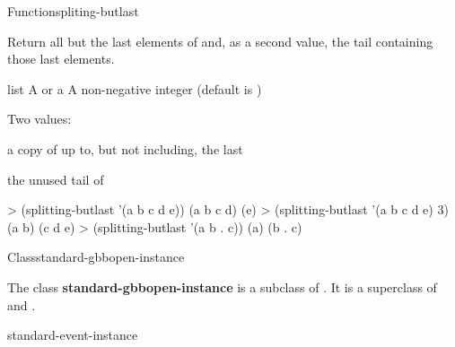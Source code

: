 \documentclass[10pt,twoside,english,pdftex]{article}
\begin{document}
\begin{functiondoc}{Function}{spliting-butlast}{ 
     \returns{} } 
%
%
  
\fnsyntax

\fnpurpose Return all but the last  elements of 
and, as a second value, the tail containing those last 
elements. 

\fnpackage {}

\fnmodule {}

\fnargs
\begin{args}{list}
\arg[list] A  or a 
\arg[n] A non-negative integer (default is )
\end{args}

\fnreturns Two values:
\begin{tightitemize}
\item a copy of  up to, but not including, the last
   
\item the unused tail of 
\end{tightitemize}

\fnexamples
\begin{example}
> (splitting-butlast '(a b c d e))
(a b c d)
(e)
> (splitting-butlast '(a b c d e) 3)
(a b)
(c d e)
> (splitting-butlast '(a b . c))
(a)
(b . c)
\end{example}

\end{functiondoc}


\begin{functiondoc}{Class}{standard-gbbopen-instance}{}
%
  
\fnsyntax

\fnpackage {}

\fnmodule {}

\fndescription The class \textbf{standard-gbbopen-instance} is a subclass of
.  It is a superclass of
\textbf{} and
\textbf{}.

\begin{alsos}{standard-event-instance}
\end{alsos}

\end{functiondoc}
\end{document}
